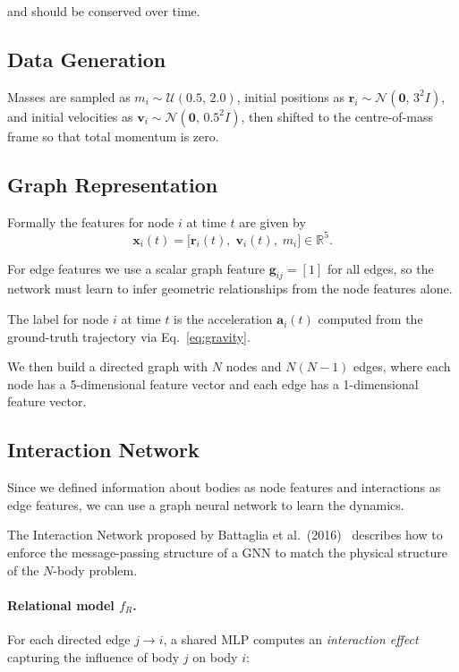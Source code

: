 \documentclass[11pt, a4paper]{article}
\begin{document}
and should be conserved over time.

\subsection{Data Generation}


Masses are sampled as $m_i \sim \mathcal{U}(0.5,\,2.0)$, initial positions as
$\mathbf{r}_i \sim \mathcal{N}(\mathbf{0},\,3^2 I)$, and initial velocities as
$\mathbf{v}_i \sim \mathcal{N}(\mathbf{0},\,0.5^2 I)$, then shifted to the centre-of-mass frame
so that total momentum is zero.


\subsection{Graph Representation}

Formally the features for node $i$ at time $t$ are given by
\begin{equation}
    \mathbf{x}_i(t) = \bigl[\mathbf{r}_i(t),\;\mathbf{v}_i(t),\;m_i\bigr] \in \mathbb{R}^5.
\end{equation}

For edge features we use a scalar graph feature $\mathbf{g}_{ij} = [1]$ for all edges, so the network must learn to infer geometric relationships from the node features alone.

The label for node $i$ at time $t$ is the acceleration $\mathbf{a}_i(t)$ computed from the ground-truth trajectory via Eq.~\eqref{eq:gravity}.

We then build a directed graph with $N$ nodes and $N(N-1)$ edges, where each node has a 5-dimensional feature vector and each edge has a 1-dimensional feature vector.


\subsection{Interaction Network}

Since we defined information about bodies as node features and interactions as edge features, we can use a graph neural network to learn the dynamics.

The Interaction Network proposed by Battaglia et al.\ (2016)~\cite{battaglia2016interactionnetworkslearningobjects} describes how to enforce the message-passing structure of a GNN to match the physical structure of the $N$-body problem.

\paragraph{Relational model $f_R$.}
For each directed edge $j \to i$, a shared MLP computes an \emph{interaction effect} capturing the
influence of body $j$ on body $i$:
\end{document}
